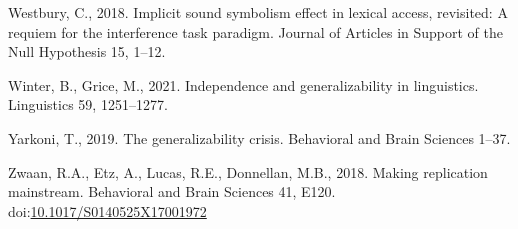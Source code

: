 \documentclass[]{elsarticle} %
\newlength{\cslhangindent}
\newlength{\cslentryspacingunit} %
\newenvironment{CSLReferences}[2] %
 {%
  \setlength{\parindent}{0pt}
  \ifodd #1
  \let\oldpar\par
  \def\par{\hangindent=\cslhangindent\oldpar}
  \fi
  \setlength{\parskip}{#2\cslentryspacingunit}
 }%
 {}
\begin{document}
\begin{CSLReferences}{1}{0}
\leavevmode{}%
Westbury, C., 2018. Implicit sound symbolism effect in lexical access, revisited: {A} requiem for the interference task paradigm. Journal of Articles in Support of the Null Hypothesis 15, 1--12.

\leavevmode{}%
Winter, B., Grice, M., 2021. Independence and generalizability in linguistics. Linguistics 59, 1251--1277.

\leavevmode{}%
Yarkoni, T., 2019. The generalizability crisis. Behavioral and Brain Sciences 1--37.

\leavevmode{}%
Zwaan, R.A., Etz, A., Lucas, R.E., Donnellan, M.B., 2018. Making replication mainstream. Behavioral and Brain Sciences 41, E120. doi:\href{https://doi.org/10.1017/S0140525X17001972}{10.1017/S0140525X17001972}

\end{CSLReferences}
\end{document}
